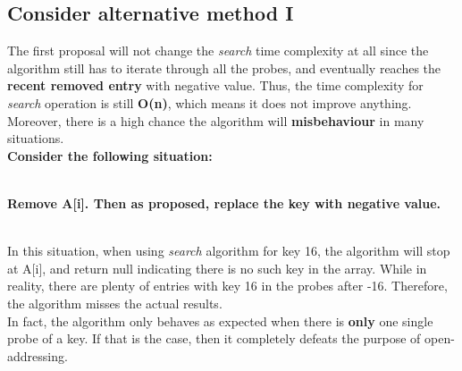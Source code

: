 \subsection{Consider alternative method I}
The first proposal will not change the \textit{search} time complexity at all since the algorithm still has to iterate through all the probes, and eventually reaches the \textbf{recent removed entry} with negative value. Thus, the time complexity for \textit{search} operation is still \textbf{O(n)}, which means it does not improve anything.
\\
Moreover, there is a high chance the algorithm will \textbf{misbehaviour} in many situations. 
\\
\textbf{Consider the following situation:}
\\
\\
\textbf{Remove A[i]. Then as proposed, replace the key with negative value.}
\\
\\
In this situation, when using \textit{search} algorithm for key 16, the algorithm will stop at A[i], and return null indicating there is no such key in the array. While in reality, there are plenty of entries with key 16 in the probes after -16. Therefore, the algorithm misses the actual results.
\\
In fact, the algorithm only behaves as expected when there is \textbf{only} one single probe of a key. If that is the case, then it completely defeats the purpose of open-addressing.

